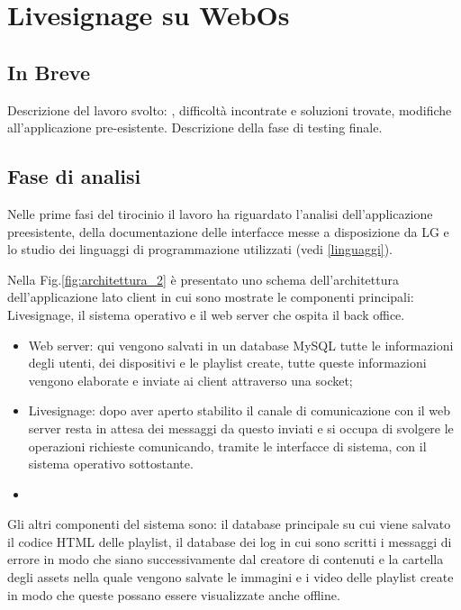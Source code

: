 \chapter{Livesignage su WebOs}\label{svolgimento}
\section{In Breve}
Descrizione del lavoro svolto: , difficoltà incontrate e soluzioni trovate, modifiche all'applicazione pre-esistente. Descrizione della fase di testing finale.

\section{Fase di analisi}

Nelle prime fasi del tirocinio il lavoro ha riguardato l'analisi dell'applicazione preesistente, della documentazione delle interfacce messe a disposizione da LG e lo studio dei linguaggi di programmazione utilizzati (vedi \ref*{linguaggi}).

Nella Fig.\ref*{fig:architettura_2} è presentato uno schema dell'architettura dell'applicazione lato client in cui sono mostrate le componenti principali: Livesignage, il sistema operativo e il web server che ospita il back office.

\begin{itemize}
    \item Web server: qui vengono salvati in un database MySQL tutte le informazioni degli utenti, dei dispositivi e le playlist create, tutte queste informazioni vengono elaborate e inviate ai client attraverso una socket;
    \item Livesignage: dopo aver aperto stabilito il canale di comunicazione con il web server resta in attesa dei messaggi da questo inviati e si occupa di svolgere le operazioni richieste comunicando, tramite le interfacce di sistema, con il sistema operativo sottostante.
    \item {}
\end{itemize}

Gli altri componenti del sistema sono: il database principale su cui viene salvato il codice HTML delle playlist, il database dei log in cui sono scritti i messaggi di errore in modo che siano successivamente  dal creatore di contenuti e la cartella degli assets nella quale vengono salvate le immagini e i video delle playlist create in modo che queste possano essere visualizzate anche offline.

